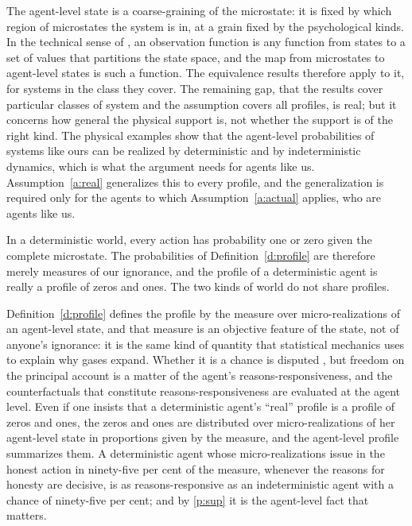 \documentclass{situationist-preprint}
\begin{document}
\begin{reply}
The agent-level state is a coarse-graining of the microstate: it is fixed by which region of microstates the system is in, at a grain fixed by the psychological kinds. In the technical sense of \citet{Werndl2009}, an observation function is any function from states to a set of values that partitions the state space, and the map from microstates to agent-level states is such a function. The equivalence results therefore apply to it, for systems in the class they cover. The remaining gap, that the results cover particular classes of system and the assumption covers all profiles, is real; but it concerns how general the physical support is, not whether the support is of the right kind. The physical examples show that the agent-level probabilities of systems like ours can be realized by deterministic and by indeterministic dynamics, which is what the argument needs for agents like us. Assumption~\ref{a:real} generalizes this to every profile, and the generalization is required only for the agents to which Assumption~\ref{a:actual} applies, who are agents like us.
\end{reply}

\begin{objection}\label{o:detchance}
In a deterministic world, every action has probability one or zero given the complete microstate. The probabilities of Definition~\ref{d:profile} are therefore merely measures of our ignorance, and the profile of a deterministic agent is really a profile of zeros and ones. The two kinds of world do not share profiles.
\end{objection}

\begin{reply}
Definition~\ref{d:profile} defines the profile by the measure over micro-realizations of an agent-level state, and that measure is an objective feature of the state, not of anyone's ignorance: it is the same kind of quantity that statistical mechanics uses to explain why gases expand. Whether it is a chance is disputed \citep{Loewer2001,Glynn2010}, but freedom on the principal account is a matter of the agent's reasons-responsiveness, and the counterfactuals that constitute reasons-responsiveness are evaluated at the agent level. Even if one insists that a deterministic agent's \enquote{real} profile is a profile of zeros and ones, the zeros and ones are distributed over micro-realizations of her agent-level state in proportions given by the measure, and the agent-level profile summarizes them. A deterministic agent whose micro-realizations issue in the honest action in ninety-five per cent of the measure, whenever the reasons for honesty are decisive, is as reasons-responsive as an indeterministic agent with a chance of ninety-five per cent; and by \ref{p:sup} it is the agent-level fact that matters.
\end{reply}
\end{document}
